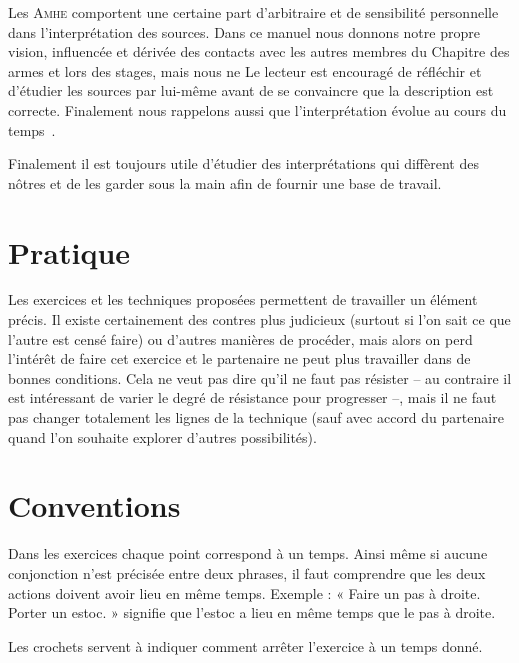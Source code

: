 Les \textsc{Amhe} comportent une certaine part d'arbitraire et de sensibilité personnelle dans l'interprétation des sources.
Dans ce manuel nous donnons notre propre vision, influencée et dérivée des contacts avec les autres membres du Chapitre des armes et lors des stages, mais nous ne 
Le lecteur est encouragé de réfléchir et d'étudier les sources par lui-même avant de se convaincre que la description est correcte.
Finalement nous rappelons aussi que l'interprétation évolue au cours du temps~\footnotemark{}.

Finalement il est toujours utile d'étudier des interprétations qui diffèrent des nôtres et de les garder sous la main afin de fournir une base de travail.


\section{Pratique}


Les exercices et les techniques proposées permettent de travailler un élément précis.
Il existe certainement des contres plus judicieux (surtout si l'on sait ce que l'autre est censé faire) ou d'autres manières de procéder, mais alors on perd l'intérêt de faire cet exercice et le partenaire ne peut plus travailler dans de bonnes conditions.
Cela ne veut pas dire qu'il ne faut pas résister – au contraire il est intéressant de varier le degré de résistance pour progresser –, mais il ne faut pas changer totalement les lignes de la technique (sauf avec accord du partenaire quand l'on souhaite explorer d'autres possibilités).


\section{Conventions}


Dans les exercices chaque point correspond à un temps. Ainsi même si aucune conjonction n'est précisée entre deux phrases, il faut comprendre que les deux actions doivent avoir lieu en même temps. Exemple : « Faire un pas à droite. Porter un estoc. » signifie que l'estoc a lieu en même temps que le pas à droite.

Les crochets servent à indiquer comment arrêter l'exercice à un temps donné.


